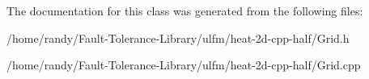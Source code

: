 The documentation for this class was generated from the following files\+:\begin{DoxyCompactItemize}
\item 
/home/randy/\+Fault-\/\+Tolerance-\/\+Library/ulfm/heat-\/2d-\/cpp-\/half/Grid.\+h\item 
/home/randy/\+Fault-\/\+Tolerance-\/\+Library/ulfm/heat-\/2d-\/cpp-\/half/Grid.\+cpp\end{DoxyCompactItemize}
